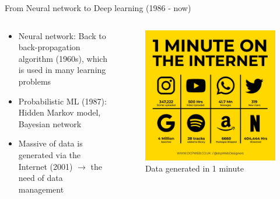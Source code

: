\begin{frame}{From Neural network to Deep learning (1986 - now)}
    \begin{columns}
        \begin{column}{0.5\textwidth}
            \begin{itemize}
                \item Neural network: Back to back-propagation algorithm (1960s), which is used in many learning problems
                \item Probabilistic ML (1987): Hidden Markov model, Bayesian network %
                \item Massive of data is generated via the Internet (2001) $\to$ the need of data management
            \end{itemize}
        \end{column}

        \begin{column}{0.5\textwidth}
            \begin{figure}
                \centering
                \includegraphics[width=0.8\linewidth]{img/statistic.png}
                \caption{Data generated in 1 minute}
            \end{figure}
        \end{column}
    \end{columns}
\end{frame}


